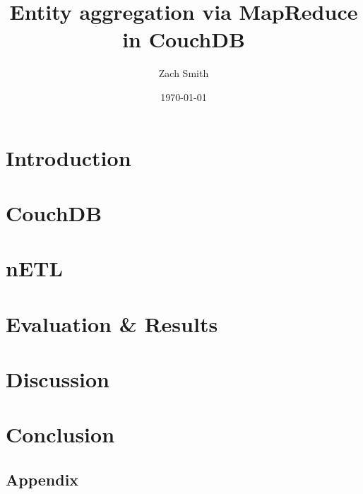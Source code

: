 \documentclass[
    parskip=full,
    a4paper
]{scrartcl}
\title{Entity aggregation via MapReduce in CouchDB}
\author{Zach Smith}
\date{\today}
\begin{document}
\maketitle
\thispagestyle{empty}

\begin{abstract}
    
\end{abstract}
\newpage

\tableofcontents
\newpage

\section{Introduction}




\section{CouchDB}



\section{nETL}




\section{Evaluation \& Results}




\section{Discussion}


\section{Conclusion}



\newpage




\begin{appendix}
    \section{Appendix}
    
    
    
    
    
    
    \listoffigures
    \listoftables
\end{appendix}
\newpage

\end{document}
